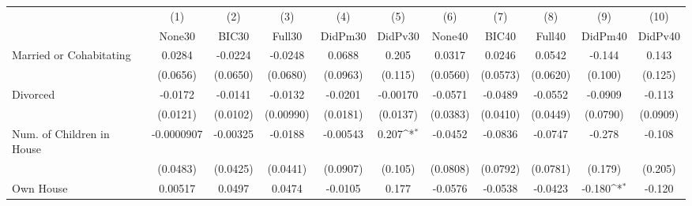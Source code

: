 {
\def\sym#1{\ifmmode^{#1}\else\(^{#1}\)\fi}
\begin{tabular}{l*{10}{c}}
\toprule
            &\multicolumn{1}{c}{(1)}&\multicolumn{1}{c}{(2)}&\multicolumn{1}{c}{(3)}&\multicolumn{1}{c}{(4)}&\multicolumn{1}{c}{(5)}&\multicolumn{1}{c}{(6)}&\multicolumn{1}{c}{(7)}&\multicolumn{1}{c}{(8)}&\multicolumn{1}{c}{(9)}&\multicolumn{1}{c}{(10)}\\
            &\multicolumn{1}{c}{None30}&\multicolumn{1}{c}{BIC30}&\multicolumn{1}{c}{Full30}&\multicolumn{1}{c}{DidPm30}&\multicolumn{1}{c}{DidPv30}&\multicolumn{1}{c}{None40}&\multicolumn{1}{c}{BIC40}&\multicolumn{1}{c}{Full40}&\multicolumn{1}{c}{DidPm40}&\multicolumn{1}{c}{DidPv40}\\
\midrule
Married or Cohabitating&      0.0284         &     -0.0224         &     -0.0248         &      0.0688         &       0.205         &      0.0317         &      0.0246         &      0.0542         &      -0.144         &       0.143         \\
            &    (0.0656)         &    (0.0650)         &    (0.0680)         &    (0.0963)         &     (0.115)         &    (0.0560)         &    (0.0573)         &    (0.0620)         &     (0.100)         &     (0.125)         \\
\addlinespace
Divorced    &     -0.0172         &     -0.0141         &     -0.0132         &     -0.0201         &    -0.00170         &     -0.0571         &     -0.0489         &     -0.0552         &     -0.0909         &      -0.113         \\
            &    (0.0121)         &    (0.0102)         &   (0.00990)         &    (0.0181)         &    (0.0137)         &    (0.0383)         &    (0.0410)         &    (0.0449)         &    (0.0790)         &    (0.0909)         \\
\addlinespace
Num. of Children in House&  -0.0000907         &    -0.00325         &     -0.0188         &    -0.00543         &       0.207\sym{*}  &     -0.0452         &     -0.0836         &     -0.0747         &      -0.278         &      -0.108         \\
            &    (0.0483)         &    (0.0425)         &    (0.0441)         &    (0.0907)         &     (0.105)         &    (0.0808)         &    (0.0792)         &    (0.0781)         &     (0.179)         &     (0.205)         \\
\addlinespace
Own House   &     0.00517         &      0.0497         &      0.0474         &     -0.0105         &       0.177         &     -0.0576         &     -0.0538         &     -0.0423         &      -0.180\sym{*}  &      -0.120         \\

\end{tabular}}

